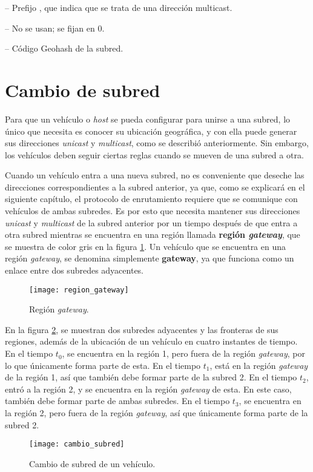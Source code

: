  -- Prefijo , que indica que se trata
de una dirección multicast.

 -- No se usan; se fijan en 0.

 -- Código Geohash de la subred.

\section{Cambio de subred}
\label{sec:cambio_subred}

Para que un vehículo o \textit{host} se pueda configurar para unirse a una
subred, lo único que necesita es conocer su ubicación geográfica, y con ella
puede generar sus direcciones \textit{unicast} y \textit{multicast}, como se
describió anteriormente. Sin embargo, los vehículos deben seguir ciertas reglas
cuando se mueven de una subred a otra.

Cuando un vehículo entra a una nueva subred, no es conveniente que deseche las
direcciones correspondientes a la subred anterior, ya que, como se explicará en
el siguiente capítulo, el protocolo de enrutamiento requiere que se comunique
con vehículos de ambas subredes. Es por esto que necesita mantener sus
direcciones \textit{unicast} y \textit{multicast} de la subred anterior por un
tiempo después de que entra a otra subred mientras se encuentra en una región
llamada \textbf{región \textit{gateway}}, que se muestra de color gris en la
figura \ref{fig:region_gateway}. Un vehículo que se encuentra en una región
\textit{gateway}, se denomina simplemente \textbf{gateway}, ya que funciona como
un enlace entre dos subredes adyacentes.

\begin{figure}[th]
\centering
\texttt{[image: region\_gateway]}
\decoRule
\caption[Región \textit{gateway}]{Región \textit{gateway}.}
\label{fig:region_gateway}
\end{figure}

En la figura \ref{fig:cambio_subred}, se muestran dos subredes adyacentes y las
fronteras de sus regiones, además de la ubicación de un vehículo en cuatro
instantes de tiempo. En el tiempo $t_0$, se encuentra en la región 1, pero fuera
de la región \textit{gateway}, por lo que únicamente forma parte de esta. En el
tiempo $t_1$, está en la región \textit{gateway} de la región 1, así que
también debe formar parte de la subred 2. En el tiempo $t_2$, entró a la región
2, y se encuentra en la región \textit{gateway} de esta. En este caso, también
debe formar parte de ambas subredes. En el tiempo $t_3$, se encuentra en la
región 2, pero fuera de la región \textit{gateway}, así que únicamente forma
parte de la subred 2.

\begin{figure}[th]
\centering
\texttt{[image: cambio\_subred]}
\decoRule
\caption[Cambio de subred de un vehículo]{Cambio de subred de un vehículo.}
\label{fig:cambio_subred}
\end{figure}
